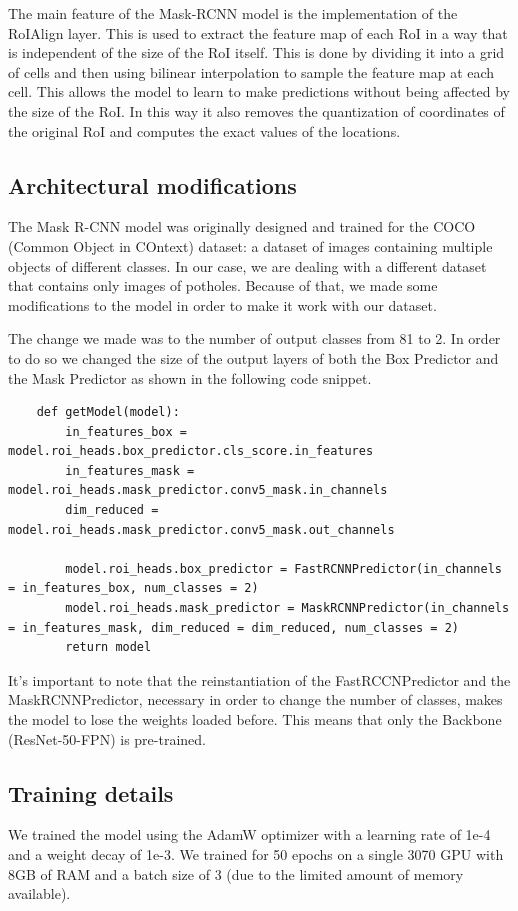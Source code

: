 The main feature of the Mask-RCNN model is the implementation of the RoIAlign layer. This is used to extract the feature map of each RoI in a way that is independent of the size of the RoI itself. This is done by dividing it into a grid of cells and then using bilinear interpolation to sample the feature map at each cell. This allows the model to learn to make predictions without being affected by the size of the RoI.
In this way it also removes the quantization of coordinates of the original RoI and computes the exact values of the locations.


\subsection{Architectural modifications}
The Mask R-CNN model was originally designed and trained for the COCO (Common Object in COntext) dataset: a dataset of images containing multiple objects of different classes. In our case, we are dealing with a different dataset that contains only images of potholes. Because of that, we made some modifications to the model in order to make it work with our dataset.

The change we made was to the number of output classes from 81 to 2. In order to do so we changed the size of the output layers of both the Box Predictor and the Mask Predictor as shown in the following code snippet.

\begin{lstlisting}
    def getModel(model):
        in_features_box = model.roi_heads.box_predictor.cls_score.in_features
        in_features_mask = model.roi_heads.mask_predictor.conv5_mask.in_channels
        dim_reduced = model.roi_heads.mask_predictor.conv5_mask.out_channels

        model.roi_heads.box_predictor = FastRCNNPredictor(in_channels = in_features_box, num_classes = 2)
        model.roi_heads.mask_predictor = MaskRCNNPredictor(in_channels = in_features_mask, dim_reduced = dim_reduced, num_classes = 2)
        return model
\end{lstlisting}

It's important to note that the reinstantiation of the FastRCCNPredictor and the MaskRCNNPredictor, necessary in order to change the number of classes, makes the model to lose the weights loaded before. This means that only the Backbone (ResNet-50-FPN) is pre-trained.


\subsection{Training details}
We trained the model using the AdamW optimizer with a learning rate of 1e-4 and a weight decay of 1e-3. We trained for 50 epochs on a single 3070 GPU with 8GB of RAM and a batch size of 3 (due to the limited amount of memory available).

